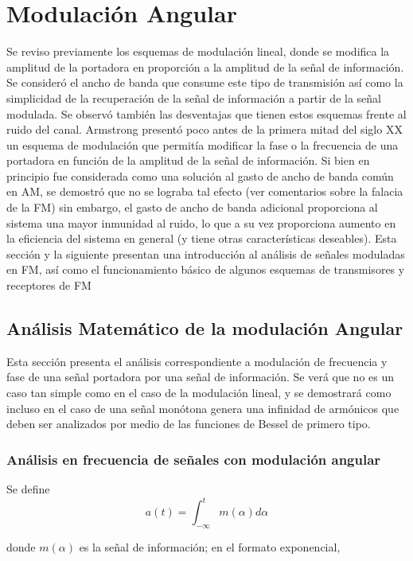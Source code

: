 \documentclass[12pt,letterpaper,titlepage,twoside]{book}
\begin{document}
\chapter{Modulación Angular}

Se reviso previamente los esquemas de modulación lineal, donde se modifica la amplitud de la portadora en proporción a la amplitud de la señal de información. Se consideró el ancho de banda que consume este tipo de transmisión así como la simplicidad de la recuperación de la señal de información a partir de la señal modulada. Se observó también las desventajas que tienen estos esquemas frente al ruido del canal. Armstrong presentó poco antes de la primera mitad del siglo XX un esquema de modulación que permitía modificar la fase o la frecuencia de una portadora en función de la amplitud de la señal de información. Si bien en principio fue considerada como una solución al gasto de ancho de banda común en AM, se demostró que no se lograba tal efecto (ver comentarios sobre la falacia de la FM) sin embargo, el gasto de ancho de banda adicional proporciona al sistema una mayor inmunidad al ruido, lo que a su vez proporciona aumento en la eficiencia del sistema en general (y tiene otras características deseables). Esta sección y la siguiente presentan una introducción al análisis de señales moduladas en FM, así como el funcionamiento básico de algunos esquemas de transmisores y receptores de FM 
\section{Análisis Matemático de la modulación Angular}
Esta sección presenta el análisis correspondiente a modulación de frecuencia y fase de una señal portadora por una señal de información. Se verá que no es un caso tan simple como en el caso de la modulación lineal, y se demostrará como incluso en el caso de una señal monótona genera una infinidad de armónicos que deben ser analizados por medio de las funciones de Bessel de primero tipo.

\subsection{Análisis en frecuencia de señales con modulación angular}
Se define
\begin{equation}
a(t)  = \int_{-\infty}^t m\left( \alpha \right) d\alpha
\end{equation}

donde $m\left( \alpha \right)$ es la señal de información; en el formato exponencial, 
\end{document}
